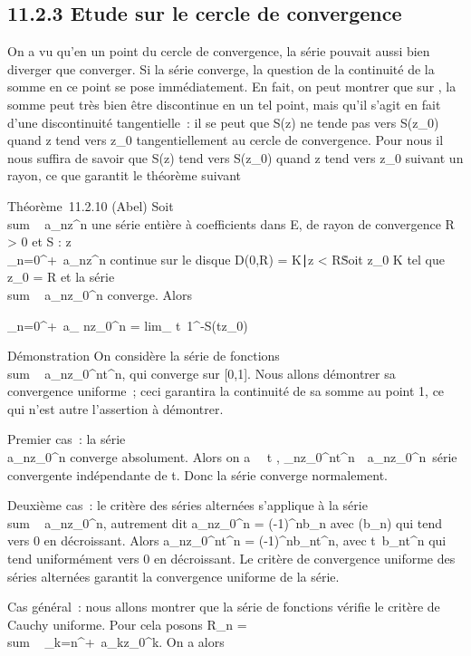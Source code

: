 \documentclass[]{article}
\begin{document}
\subsection{11.2.3 Etude sur le cercle de convergence}

On a vu qu'en un point du cercle de convergence, la série pouvait aussi
bien diverger que converger. Si la série converge, la question de la
continuité de la somme en ce point se pose immédiatement. En fait, on
peut montrer que sur , la somme peut très bien être discontinue en un
tel point, mais qu'il s'agit en fait d'une discontinuité tangentielle~:
il se peut que S(z) ne tende pas vers S(z_0) quand z tend vers
z_0 tangentiellement au cercle de convergence. Pour nous il
nous suffira de savoir que S(z) tend vers S(z_0) quand z tend
vers z_0 suivant un rayon, ce que garantit le théorème suivant

Théorème~11.2.10 (Abel) Soit
\\sum ~
a_nz^n une série entière à coefficients dans E, de
rayon de convergence R > 0 et S :
z\mapsto~\\\sum
 _n=0^+\infty~a_nz^n continue sur le
disque D(0,R) = \z \in
K∣z <
R\. Soit z_0 \in K tel que
z_0 = R et la série
\\sum ~
a_nz_0^n converge. Alors

\sum _n=0^+\infty~a_
nz_0^n = lim_
t\rightarrow~1^-S(tz_0)

Démonstration On considère la série de fonctions
\\sum ~
a_nz_0^nt^n, qui converge sur
[0,1]. Nous allons démontrer sa convergence uniforme~; ceci
garantira la continuité de sa somme au point 1, ce qui n'est autre
l'assertion à démontrer.

Premier cas~: la série \\\sum
 a_nz_0^n converge absolument. Alors on a
\forall~~t \in [0,1],
\a_nz_0^nt^n\
\leq\
a_nz_0^n\, série
convergente indépendante de t. Donc la série converge normalement.

Deuxième cas~: le critère des séries alternées s'applique à la série
\\sum ~
a_nz_0^n, autrement dit
a_nz_0^n = (-1)^nb_n avec
(b_n) qui tend vers 0 en décroissant. Alors
a_nz_0^nt^n =
(-1)^nb_nt^n, avec
t\mapsto~b_nt^n qui tend
uniformément vers 0 en décroissant. Le critère de convergence uniforme
des séries alternées garantit la convergence uniforme de la série.

Cas général~: nous allons montrer que la série de fonctions vérifie le
critère de Cauchy uniforme. Pour cela posons R_n
= \\sum ~
_k=n^+\infty~a_kz_0^k. On a alors
\end{document}
